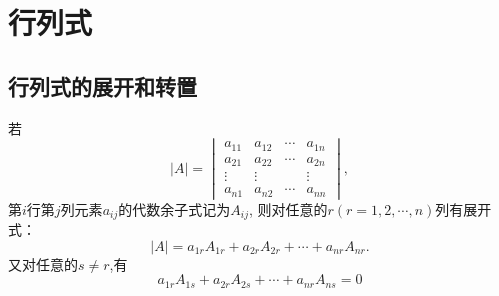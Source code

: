 \section{行列式}

\subsection{行列式的展开和转置}
\begin{theorem}\label{thm:1-1}
  若
  \begin{equation}
    \label{eq:0-1}
  |A|=
  \begin{vmatrix}
    a_{11} & a_{12} & \cdots & a_{1n}\\
    a_{21} & a_{22} & \cdots & a_{2n}\\
    \vdots & \vdots & & \vdots\\
    a_{n1} & a_{n2} & \cdots & a_{nn}
  \end{vmatrix},
\end{equation}
第$i$行第$j$列元素$a_{ij}$的代数余子式记为$A_{ij}$,
则对任意的$r(r=1,2,\cdots,n)$列有展开式：
  \begin{equation}
    \label{eq:0-2}
    |A|=a_{1r}A_{1r}+ a_{2r}A_{2r}+\cdots+a_{nr}A_{nr}.
  \end{equation}
  又对任意的$s \neq r$,有
  \begin{equation}
    \label{eq:0-3}
    a_{1r}A_{1s}+a_{2r}A_{2s}+\cdots+a_{nr}A_{ns}=0
  \end{equation}
\end{theorem}

